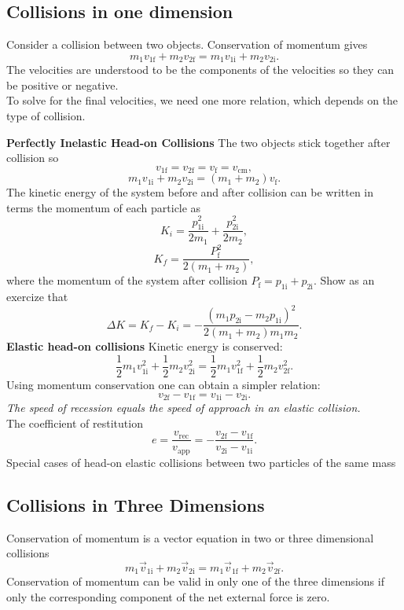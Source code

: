 \documentclass[11pt,letterpaper]{report}
\begin{document}
\subsection{Collisions in one dimension}
Consider a collision between two objects. Conservation of momentum gives $$m_1 v_{1\mathrm{f}} + m_2 v_{2\mathrm{f}} = m_1 v_{1\mathrm{i}} + m_2 v_{2\mathrm{i}}.$$
The velocities are understood to be the components of the velocities so they can be positive or negative.
\\To solve for the final velocities, we need one more relation, which depends on the type of collision.

\medskip

\noindent
\textbf{Perfectly Inelastic Head-on Collisions} The two objects stick together after collision so $$v_{1\mathrm{f}} = v_{2\mathrm{f}} = v_\mathrm{f} = v_\mathrm{cm},$$ $$m_1 v_{1\mathrm{i}} + m_2 v_{2\mathrm{i}} = \left(m_1 + m_2\right) v_\mathrm{f}.$$
The kinetic energy of the system before and after collision can be written in terms the momentum of each particle as $$K_i = \frac{p_{1\mathrm{i}}^2}{2m_1} + \frac{p_{2\mathrm{i}}^2}{2m_2},$$ $$K_f = \frac{P_\mathrm{f}^2}{2\left(m_1 + m_2\right)},$$ where the momentum of the system after collision $P_\mathrm{f} = p_{1\mathrm{i}} + p_{2\mathrm{i}}$. Show as an exercize that $$\Delta{K} = K_f - K_i = -\frac{\left(m_1 p_{2\mathrm{i}} - m_2 p_{1\mathrm{i}}\right)^2}{2\left(m_1 + m_2\right) m_1 m_2}.$$
\textbf{Elastic head-on collisions} Kinetic energy is conserved: $$\frac{1}{2} m_1 v_{1\mathrm{i}}^2 + \frac{1}{2} m_2 v_{2\mathrm{i}}^2 = \frac{1}{2} m_1 v_{1\mathrm{f}}^2 + \frac{1}{2} m_2 v_{2\mathrm{f}}^2.$$
Using momentum conservation one can obtain a simpler relation: $$v_{2\mathrm{f}} - v_{1\mathrm{f}} = v_{1\mathrm{i}} - v_{2\mathrm{i}}.$$
\textit{The speed of recession equals the speed of approach in an elastic collision.}
\\The coefficient of restitution $$e = \frac{v_\mathrm{rec}}{v_\mathrm{app}} = -\frac{v_{2\mathrm{f}} - v_{1\mathrm{f}}}{v_{2\mathrm{i}} - v_{1\mathrm{i}}}.$$
Special cases of head-on elastic collisions between two particles of the same mass

\subsection{Collisions in Three Dimensions}
Conservation of momentum is a vector equation in two or three dimensional collisions $$m_1 \vec{v}_{1\mathrm{i}} + m_2 \vec{v}_{2\mathrm{i}} = m_1 \vec{v}_{1\mathrm{f}} + m_2 \vec{v}_{2\mathrm{f}}.$$
Conservation of momentum can be valid in only one of the three dimensions if only the corresponding component of the net external force is zero.
\end{document}
